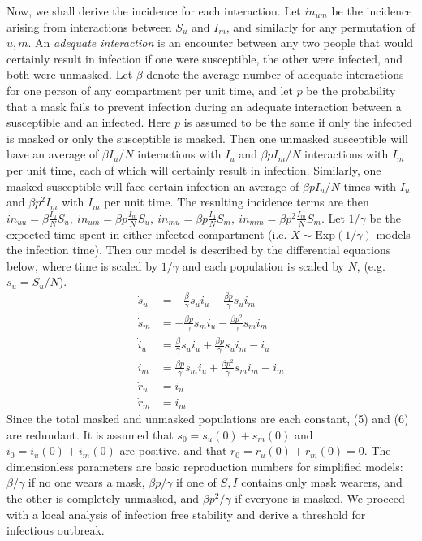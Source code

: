 \documentclass[11pt]{article}
\begin{document}
Now, we shall derive the incidence for each interaction. Let $in_{um}$ be the incidence arising from interactions between $S_{u}$ and $I_{m}$, and similarly for any permutation of $u,m$. An \textit{adequate interaction} is an encounter between any two people that would certainly result in infection if one were susceptible, the other were infected, and both were unmasked. Let $\beta$ denote the average number of adequate interactions for one person of any compartment per unit time, and let $p$ be the probability that a mask fails to prevent infection during an adequate interaction between a susceptible and an infected. Here $p$ is assumed to be the same if only the infected is masked or only the susceptible is masked. Then one unmasked susceptible will have an average of $\beta I_{u}/N$ interactions with $I_{u}$ and $\beta p I_{m}/N$ interactions with $I_{m}$ per unit time, each of which will certainly result in infection. Similarly, one masked susceptible will face certain infection an average of $\beta p I_{u}/N$ times with $I_{u}$ and $\beta p^{2} I_{m}$ with $I_{m}$ per unit time. The resulting incidence terms are then $in_{uu} = \beta \frac{I_{u}}{N}S_{u},~in_{um} = \beta p \frac{I_{m}}{N}S_{u},~ in_{mu} = \beta p \frac{I_{u}}{N}S_{m},~in_{mm} = \beta p^{2} \frac{I_{m}}{N}S_{m}$.
Let $1/\gamma$ be the expected time spent in either infected compartment (i.e. $X \sim \text{Exp}(1/\gamma)$ models the infection time). Then our model is described by the differential equations below, where time is scaled by $1/\gamma$ and each population is scaled by $N$, (e.g. $s_{u} = S_{u}/N$).
\begin{align}
  \dot{s}_u &= - \frac{\beta }{\gamma}s_u i_u -  \frac{\beta p }{\gamma}s_u i_m \\
  \dot{s}_m &= - \frac{\beta p }{\gamma}s_m i_u -  \frac{\beta p^{2} }{\gamma} s_m i_m \\
  \dot{i}_u &=  \frac{\beta }{\gamma}s_u i_u +  \frac{\beta p }{\gamma}s_u i_m - i_u \\
  \dot{i}_m &=  \frac{\beta p }{\gamma}s_m i_u +  \frac{\beta p^{2} }{\gamma} s_m i_m - i_m\\
  \dot{r}_{u} &= i_{u}\\
  \dot{r}_{m} &= i_{m}
\end{align}
Since the total masked and unmasked populations are each constant, (5) and (6) are redundant. It is assumed that $s_0 = s_{u}(0) + s_{m}(0)$ and $i_{0} = i_{u}(0) + i_{m}(0)$ are positive, and that $r_{0} = r_{u}(0) + r_{m}(0) = 0$. The dimensionless parameters are basic reproduction numbers for simplified models: $\beta/\gamma$ if no one wears a mask, $\beta p/\gamma$ if one of $S, I$ contains only mask wearers, and the other is completely unmasked, and $\beta p^{2}/\gamma$ if everyone is masked. We proceed with a local analysis of infection free stability and derive a threshold for infectious outbreak.
\end{document}
